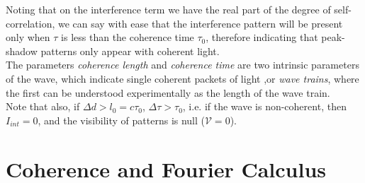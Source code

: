 \documentclass[../electromagnetism.tex]{subfiles}
\begin{document}
Noting that on the interference term we have the real part of the degree of self-correlation, we can say with ease that the interference pattern will be present only when $\tau$ is less than the coherence time $\tau_0$, therefore indicating that peak-shadow patterns only appear with coherent light.\\
The parameters \textit{coherence length} and \textit{coherence time} are two intrinsic parameters of the wave, which indicate single coherent packets of light ,or \textit{wave trains}, where the first can be understood experimentally as the length of the wave train.\\
Note that also, if $\Delta d>l_0=c\tau_0$, $\Delta\tau>\tau_0$, i.e. if the wave is non-coherent, then $I_{int}=0$, and the visibility of patterns is null ($\mathcal{V}=0$).
\section{Coherence and Fourier Calculus}
\end{document}
